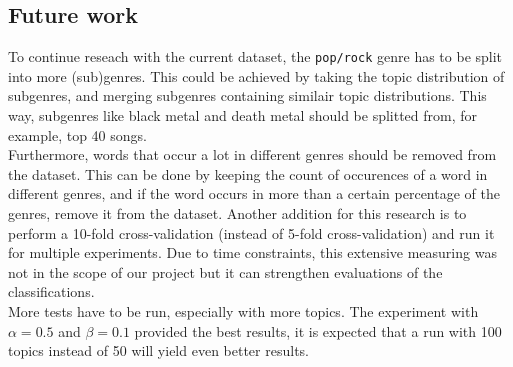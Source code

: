 \subsection{Future work}
To continue reseach with the current dataset, the \verb|pop/rock| genre has to be split into more (sub)genres. This could be achieved by taking the topic distribution of subgenres, and merging subgenres containing similair topic distributions. This way, subgenres like black metal and death metal should be splitted from, for example, top 40 songs. \\
Furthermore, words that occur a lot in different genres should be removed from the dataset. This can be done by keeping the count of occurences of a word in different genres, and if the word occurs in more than a certain percentage of the genres, remove it from the dataset.
Another addition for this research is to perform a 10-fold cross-validation (instead of 5-fold cross-validation) and run it for multiple experiments. Due to time constraints, this extensive measuring was not in the scope of our project but it can strengthen evaluations of the classifications. \\
More tests have to be run, especially with more topics. The experiment with $\alpha = 0.5$ and $\beta = 0.1$ provided the best results, it is expected that a run with 100 topics instead of 50 will yield even better results.